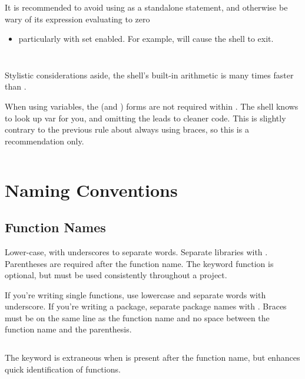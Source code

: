 \documentclass{article}
\begin{document}
It is recommended to avoid using  as a standalone statement, and otherwise be wary of its expression evaluating to zero
\begin{itemize}
    \item particularly with set  enabled. For example,  will cause the shell to exit.
\end{itemize}

\inputminted[frame=single,firstline=371, lastline=381, linenos]{bash}{./styleguide.bash}

\inputminted[frame=single,firstline=383, lastline=395, linenos]{bash}{./styleguide.bash}

Stylistic considerations aside, the shell’s built-in arithmetic is many times faster than .

When using variables, the  (and ) forms are not required within . The shell knows to look up var for you, and omitting the  leads to cleaner code. This is slightly contrary to the previous rule about always using braces, so this is a recommendation only.

\inputminted[frame=single,firstline=397, lastline=416, linenos]{bash}{./styleguide.bash}

\section{Naming Conventions}
\label{sec:name_conv}
\subsection{Function Names}
\label{subsec:func_names}
Lower-case, with underscores to separate words. Separate libraries with \code{::}. Parentheses are required after the function name. The keyword function is optional, but must be used consistently throughout a project.

If you’re writing single functions, use lowercase and separate words with underscore. If you’re writing a package, separate package names with \code{::}. Braces must be on the same line as the function name  and no space between the function name and the parenthesis.

\inputminted[frame=single,firstline=418, lastline=426, linenos]{bash}{./styleguide.bash}

The  keyword is extraneous when \code{()} is present after the function name, but enhances quick identification of functions.
\end{document}

